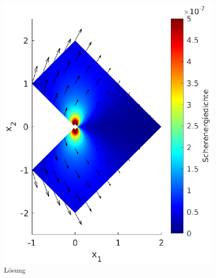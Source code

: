 \documentclass{scrartcl}
\begin{document}
\begin{figure}[h]
\begin{minipage}[b]{0.45\textwidth}
\includegraphics[width=1.3\textwidth]{Plots/LShapeBenchmarkSoln4}
\caption{Lösung}
\label{pl:LShapeBenchmarkSoln}
\end{minipage}
\end{figure}
\end{document}
